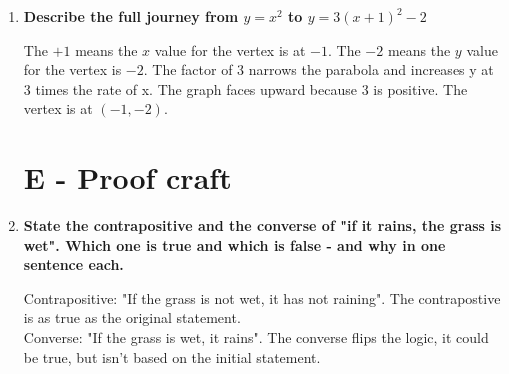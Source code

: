\documentclass{article}
\begin{document}
\begin{enumerate}[itemsep=12pt]
  \item \textbf{Describe the full journey from $y = x^{2}$ to $y = 3(x + 1)^{2} -2$} 

    The $+1$ means the $x$ value for the vertex is at $-1$. The $-2$ means the $y$ value for the vertex is $-2$.
    The factor of 3 narrows the parabola and increases y at 3 times the rate of x. 
    The graph faces upward because 3 is positive. The vertex is at $(-1,-2)$. 

  \section{E - Proof craft}
  \item \textbf{State the contrapositive and the converse of "if it rains, the grass is wet". 
    Which one is true and which is false - and why in one sentence each.} 

    Contrapositive: "If the grass is not wet, it has not raining". The contrapostive is as true as the original statement. \\
    Converse: "If the grass is wet, it rains". The converse flips the logic, it could be true, but isn't based on the initial statement.
    

\end{enumerate}
\end{document}
